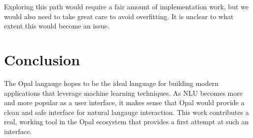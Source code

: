 \documentclass[twocolumn]{article}
\begin{document}
Exploring this path would require a fair amount of implementation work, but we
would also need to take great care to avoid overfitting. It is unclear to what
extent this would become an issue.

\section{Conclusion} \label{conclusion}
The Opal langauge hopes to be the ideal language for building modern
applications that leverage machine learning techniques. As NLU becomes more and
more popular as a user interface, it makes sense that Opal would provide a clean
and safe interface for natural langauge interaction. This work contributes a
real, working tool in the Opal ecosystem that provides a first attempt at such
an interface.

{}

\end{document}
